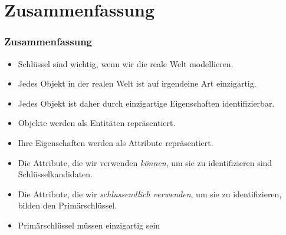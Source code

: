 \documentclass[aspectratio=169,mathserif,notheorems]{beamer}%
\begin{document}
\section{Zusammenfassung}%
%
\begin{frame}%
\frametitle{Zusammenfassung}%
\begin{itemize}%
\item Schlüssel sind wichtig, wenn wir die reale Welt modellieren.%
\item<2-> Jedes Objekt in der realen Welt ist auf irgendeine Art einzigartig.%
\item<3-> Jedes Objekt ist daher durch einzigartige Eigenschaften identifizierbar.%
\item<4-> Objekte werden als Entitäten repräsentiert.%
\item<5-> Ihre Eigenschaften werden als Attribute repräsentiert.%
\item<6-> Die Attribute, die wir verwenden \emph{können}, um sie zu identifizieren sind Schlüsselkandidaten.%
\item<7-> Die Attribute, die wir \emph{schlussendlich verwenden}, um sie zu identifizieren, bilden den Primärschlüssel.%
\item<8-> Primärschlüssel müssen einzigartig sein%
\end{itemize}%
\end{frame}%
%
\endPresentation%
\end{document}
